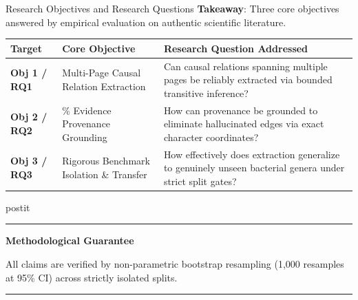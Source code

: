 \documentclass[aspectratio=43,10pt]{beamer}
\newcommand{\card}[4][\linewidth]{%
  \begin{beamercolorbox}[wd=#1,sep=0pt,rounded=false,shadow=false]{postit}%
    {\color{#3}\rule{\linewidth}{1.5pt}}\par
    \colorbox{slatebg}{%
      \begin{minipage}{\dimexpr#1-8pt\relax}%
        \vspace{1.5pt}%
        {\footnotesize\bfseries\color{#3}#2}\vspace{1.5pt}\par%
        {\scriptsize\color{darktext}#4}%
        \vspace{1.5pt}%
      \end{minipage}%
    }%
    \par{\color{bordergray}\rule{\linewidth}{0.6pt}}%
  \end{beamercolorbox}%
}
\begin{document}
\begin{frame}{Research Objectives and Research Questions}
  \textbf{Takeaway}: Three core objectives answered by empirical evaluation on authentic scientific literature.
  \vspace{0.12cm}
  \begin{center}
    \scriptsize
    \begin{tabularx}{\linewidth}{p{1.1cm}>{\raggedright\arraybackslash}p{3.7cm}>{\raggedright\arraybackslash}X}
      \toprule
      \textbf{\color{navy}Target} & \textbf{\color{navy}Core Objective} & \textbf{\color{navy}Research Question Addressed} \\
      \midrule
      \textbf{\color{teal}Obj 1 / RQ1} & Multi-Page Causal Relation Extraction & Can causal relations spanning multiple pages be reliably extracted via bounded transitive inference? \\
      \addlinespace[2pt]
      \textbf{\color{blue}Obj 2 / RQ2} & 100\% Evidence Provenance Grounding & How can provenance be grounded to eliminate hallucinated edges via exact character coordinates? \\
      \addlinespace[2pt]
      \textbf{\color{navy}Obj 3 / RQ3} & Rigorous Benchmark Isolation \& Transfer & How effectively does extraction generalize to genuinely unseen bacterial genera under strict split gates? \\
      \bottomrule
    \end{tabularx}
  \end{center}
  \vspace{0.12cm}
  \card{Methodological Guarantee}{navy}{
    All claims are verified by non-parametric bootstrap resampling (1,000 resamples at 95\% CI) across strictly isolated splits.
  }
\end{frame}
\end{document}
